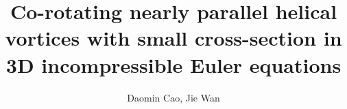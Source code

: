 \documentclass[12pt,reqno]{amsart}
\numberwithin{equation}{section}
\theoremstyle{definition}
\theoremstyle{remark}
\begin{document}
	
	
	
	
	
\title[Nearly parallel helical vortices]
{Co-rotating nearly parallel helical vortices with small cross-section in 3D incompressible Euler equations}
	
	
	
\author{Daomin Cao, Jie Wan}
	
\address{State Key Laboratory of Mathematical Sciences, Academy of Mathematics and Systems Science, Chinese Academy of Sciences, Beijing 100190, and University of Chinese Academy of Sciences, Beijing 100049,  P.R. China}
\address{School of Mathematics and Statistics, Beijing Institute of Technology, Beijing 100081,  P.R. China}

	
	
	
	
\end{document}
